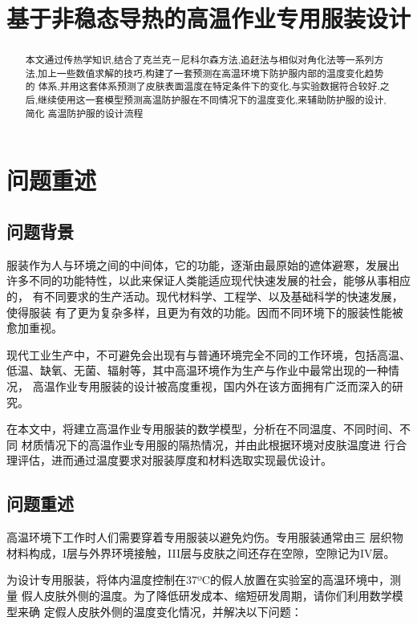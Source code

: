 \documentclass{cumcmthesis}
\title{基于非稳态导热的高温作业专用服装设计}
\begin{document}
 \maketitle
 \begin{abstract}
    本文通过传热学知识,结合了克兰克－尼科尔森方法,追赶法与相似对角化法等一系列方法,加上一些数值求解的技巧,构建了一套预测在高温环境下防护服内部的温度变化趋势的
    体系,并用这套体系预测了皮肤表面温度在特定条件下的变化,与实验数据符合较好.之后,继续使用这一套模型预测高温防护服在不同情况下的温度变化,来辅助防护服的设计,简化
    高温防护服的设计流程

\end{abstract}

\tableofcontents
\newpage
\section{问题重述}

    \subsection{问题背景}
        服装作为人与环境之间的中间体，它的功能，逐渐由最原始的遮体避寒，发展出
        许多不同的功能特性，以此来保证人类能适应现代快速发展的社会，能够从事相应的，
        有不同要求的生产活动。现代材料学、工程学、以及基础科学的快速发展，使得服装
        有了更为复杂多样，且更为有效的功能。因而不同环境下的服装性能被愈加重视。

        现代工业生产中，不可避免会出现有与普通环境完全不同的工作环境，包括高温、
        低温、缺氧、无菌、辐射等，其中高温环境作为生产与作业中最常出现的一种情况，
        高温作业专用服装的设计被高度重视，国内外在该方面拥有广泛而深入的研究。

            在本文中，将建立高温作业专用服装的数学模型，分析在不同温度、不同时间、不同
        材质情况下的高温作业专用服的隔热情况，并由此根据环境对皮肤温度进
        行合理评估，进而通过温度要求对服装厚度和材料选取实现最优设计。

    \subsection{问题重述}

        高温环境下工作时人们需要穿着专用服装以避免灼伤。专用服装通常由三
        层织物材料构成，I层与外界环境接触，III层与皮肤之间还存在空隙，空隙记为IV层。

        为设计专用服装，将体内温度控制在37ºC的假人放置在实验室的高温环境中，测量
        假人皮肤外侧的温度。为了降低研发成本、缩短研发周期，请你们利用数学模型来确
        定假人皮肤外侧的温度变化情况，并解决以下问题：
\end{document}
